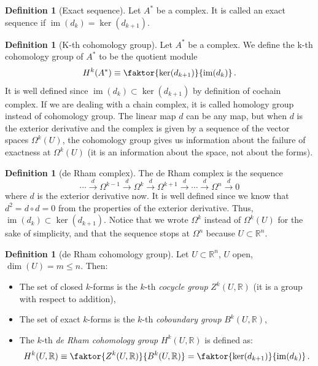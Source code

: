 \documentclass[a4paper,11pt,titlepage, article, oneside]{memoir}
\numberwithin{equation}{section}
\theoremstyle{definition}
\newtheorem{definition}[theorem]{Definition}
\theoremstyle{remark}
\DeclareMathOperator{\im}{im}
\newcommand{\rfield}{\mathbb{R}}
\begin{document}
\begin{definition}[Exact sequence]
Let $A^*$ be a complex. It is called an exact sequence if $\im(d_k) = \ker(d_{k+1})$.
\end{definition}

\begin{definition}[K-th cohomology group]
Let $A^*$ be a complex. We define the k-th cohomology group of $A^*$ to be the quotient module
\[H^k(A^*) \equiv \faktor{\ker(d_{k+1})}{\im(d_k)}\, . \]
It is well defined since $\im(d_k) \subset \ker(d_{k+1})$ by definition of cochain complex. If we are dealing with a chain complex, it is called homology group instead of cohomology group. The linear map $d$ can be any map, but when $d$ is the exterior derivative and the complex is given by a sequence of the vector spaces $\Omega^k(U)$, the cohomology group gives us information about the failure of exactness at $\Omega^k(U)$ (it is an information about the space, not about the forms).
\end{definition}

\begin{definition}[de Rham complex]
  The de Rham complex is the sequence
  $$\cdots \overset{d}{\longrightarrow} \Omega^{k-1} \overset{d}{\longrightarrow} \Omega^{k} \overset{d}{\longrightarrow} \Omega^{k+1} \overset{d}{\longrightarrow} \cdots \overset{d}{\longrightarrow} \Omega^{n} \overset{d}{\longrightarrow} 0 $$
  where $d$ is the exterior derivative now. It is well defined since we know that $d^2 = d \circ d = 0$ from the properties of the exterior derivative. Thus, $\im(d_k) \subset \ker(d_{k+1})$. Notice that we wrote $\Omega^k$ instead of $\Omega^k(U)$ for the sake of simplicity, and that the sequence stops at $\Omega^n$ because $U \subset \rfield^n$.
\end{definition}

\begin{definition}[de Rham cohomology group] \label{drremark}
  Let $U \subset \rfield^n$, $U$ open, $\dim(U) = m \le n$. Then:
  \begin{itemize}
    \item The set of closed $k$-forms is the $k$-th \textit{cocycle group} $Z^k(U, \rfield)$ (it is a group with respect to addition),
    \item The set of exact $k$-forms is the $k$-th \textit{coboundary group} $B^k(U, \rfield)$,
    \item The $k$-th \textit{de Rham cohomology group} $H^k(U, \rfield)$ is defined as: $$H^k(U, \rfield) \equiv \faktor{Z^k(U, \rfield)}{B^k(U, \rfield)} = \faktor{\ker(d_{k+1})}{\im(d_k)} \, .$$
  \end{itemize}
\end{definition}
\end{document}
